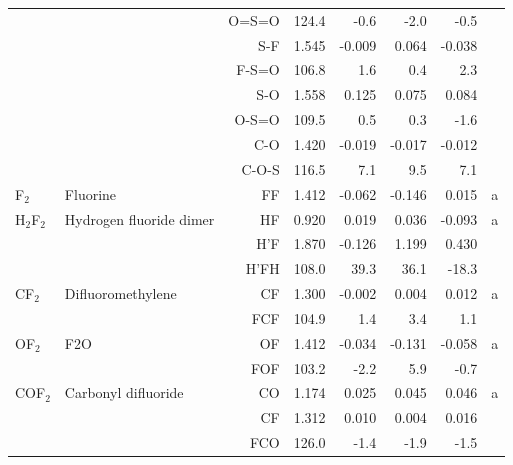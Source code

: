 \begin{table}
\begin{center}
\begin{tabular}{llrrrrrr}
             &                                    &O=S=O       &     124.4   &      -0.6 &      -2.0 &      -0.5   &       \\
             &                                    &S-F           &     1.545   &    -0.009 &     0.064 &    -0.038 &       \\
             &                                    &F-S=O       &     106.8   &       1.6 &       0.4 &       2.3   &       \\
             &                                    &S-O           &     1.558   &     0.125 &     0.075 &     0.084 &       \\
             &                                    &O-S=O       &     109.5   &       0.5 &       0.3 &      -1.6   &       \\
             &                                    &C-O           &     1.420   &    -0.019 &    -0.017 &    -0.012 &       \\
             &                                    &C-O-S       &     116.5   &       7.1 &       9.5 &       7.1   &       \\
 F$_2$          & Fluorine                           &FF            &     1.412   &    -0.062 &    -0.146 &     0.015 &     a \\
 H$_2$F$_2$        & Hydrogen fluoride dimer            &HF            &     0.920   &     0.019 &     0.036 &    -0.093 &     a \\
             &                                    &H'F           &     1.870   &    -0.126 &     1.199 &     0.430 &       \\
             &                                    &H'FH        &     108.0   &      39.3 &      36.1 &     -18.3   &       \\
 CF$_2$         & Difluoromethylene                  &CF            &     1.300   &    -0.002 &     0.004 &     0.012 &     a \\
             &                                    &FCF         &     104.9   &       1.4 &       3.4 &       1.1   &       \\
 OF$_2$         & F2O                                &OF            &     1.412   &    -0.034 &    -0.131 &    -0.058 &     a \\
             &                                    &FOF         &     103.2   &      -2.2 &       5.9 &      -0.7   &       \\
 COF$_2$        & Carbonyl difluoride                &CO            &     1.174   &     0.025 &     0.045 &     0.046 &     a \\
             &                                    &CF            &     1.312   &     0.010 &     0.004 &     0.016 &       \\
             &                                    &FCO         &     126.0   &      -1.4 &      -1.9 &      -1.5   &       \\
\hline
\end{tabular}
\end{center}
\end{table}
\clearpage

